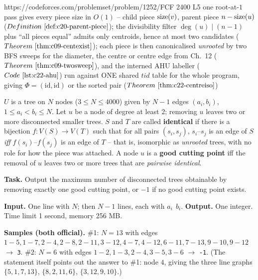   {https://codeforces.com/problemset/problem/1252/F}{CF 2400 L5}
  {one root-at-\(1\) pass gives every piece size in \(O(1)\) -- child piece \(\operatorname{size}(v)\),
   parent piece \(n-\operatorname{size}(u)\) (\(\defref{c20-parent-piece}\)); the divisibility filter
   \(\deg(u)\mid(n-1)\) plus ``all pieces equal'' admits only centroids, hence at most two
   candidates (\(\thmref{c09-centexist}\)); each piece is then canonicalised \emph{unrooted}
   by two BFS sweeps for the diameter, the centre or centre edge from Ch.~12
   (\(\thmref{c09-twosweep}\)), and the interned AHU labeller (\(\coderef{c22-ahu}\)) run
   against ONE shared \(\mathit{tid}\) table for the whole program, giving
   \(\Phi=(\mathrm{id},\mathrm{id})\) or the sorted pair (\(\thmref{c22-centreiso}\))}

\begin{problemstatement}
\(U\) is a tree on \(N\) nodes (\(3\le N\le 4000\)) given by \(N-1\) edges
\((a_i,b_i)\), \(1\le a_i<b_i\le N\). Let \(u\) be a node of degree at least \(2\); removing
\(u\) leaves two or more disconnected smaller trees. \(S\) and \(T\) are called
\textbf{identical} if there is a bijection \(f:V(S)\to V(T)\) such that for all pairs
\((s_i,s_j)\), \(s_i\)--\(s_j\) is an edge of \(S\) \emph{iff} \(f(s_i)\)--\(f(s_j)\) is an
edge of \(T\) -- that is, isomorphic as \emph{unrooted} trees, with no role for how the
piece was attached. A node \(u\) is a \textbf{good cutting point} iff the removal of \(u\)
leaves two or more trees that are \emph{pairwise identical}.

\textbf{Task.} Output the maximum number of disconnected trees obtainable by removing
exactly one good cutting point, or \(-1\) if no good cutting point exists.

\textbf{Input.} One line with \(N\); then \(N-1\) lines, each with \(a_i\ \ b_i\).
\textbf{Output.} One integer. Time limit 1 second, memory 256 MB.

\textbf{Samples (both official).} \#1: \(N{=}13\) with edges
\(1\!-\!5,1\!-\!7,2\!-\!4,2\!-\!8,2\!-\!11,3\!-\!12,4\!-\!7,4\!-\!12,6\!-\!11,7\!-\!13,
9\!-\!10,9\!-\!12\) \(\to\) \texttt{3}. \#2: \(N{=}6\) with edges
\(1\!-\!2,1\!-\!3,2\!-\!4,3\!-\!5,3\!-\!6\) \(\to\) \texttt{-1}.
(The statement itself points out the answer to \#1: node \(4\), giving the three line graphs
\(\{5,1,7,13\}\), \(\{8,2,11,6\}\), \(\{3,12,9,10\}\).)
\end{problemstatement}

